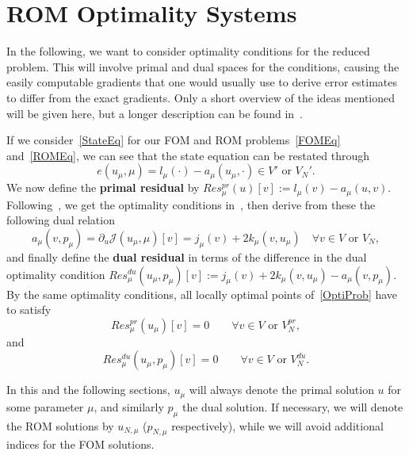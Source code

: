 \section{ROM Optimality Systems}

In the following, we want to consider optimality conditions for the reduced problem.
This will involve primal and dual spaces for the conditions, causing the easily computable gradients that one would usually use to derive error estimates to differ from the exact gradients.
Only a short overview of the ideas mentioned will be given here, but a longer description can be found in~\cite[Section 3]{Keil2021}.

If we consider~\eqref{StateEq} for our FOM and ROM problems~\eqref{FOMEq} and~\eqref{ROMEq}, we can see that the state equation can be restated through
\begin{equation*}
    e(u_\mu, \mu) = l_\mu(\cdot) - a_\mu(u_\mu, \cdot) \in V' \text{ or } V_N'.
\end{equation*}
We now define the \textbf{primal residual} by $Res_\mu^{pr}(u)[v] := l_\mu(v) - a_\mu(u, v)$.
Following~\cite[Corollary 1.3]{Hinze2009}, we get the optimality conditions in~\cite[Proposition 2.9]{Keil2021}, then derive from these the following dual relation
\begin{equation*}
    a_\mu(v, p_\mu) = \partial_u \mathcal{J}(u_\mu, \mu)[v] = j_\mu(v) + 2 k_\mu(v, u_\mu) \quad \forall v \in V \text{ or } V_N,
\end{equation*}
and finally define the \textbf{dual residual} in terms of the difference in the dual optimality condition $Res_\mu^{du}(u_\mu, p_\mu)[v] := j_\mu(v) + 2 k_\mu(v, u_\mu) - a_\mu(v, p_\mu)$.
By the same optimality conditions, all locally optimal points of~\eqref{OptiProb} have to satisfy
\begin{equation}\label{PrimalEq}
    Res_\mu^{pr}(u_\mu)[v] = 0 \qquad \forall v \in V \text{ or } V_N^{pr},
\end{equation}
and
\begin{equation}\label{DualEq}
    Res_\mu^{du}(u_\mu, p_\mu)[v] = 0 \qquad \forall v \in V \text{ or } V_N^{du}.
\end{equation}

In this and the following sections, $u_\mu$ will always denote the primal solution $u$ for some parameter $\mu$, and similarly $p_\mu$ the dual solution.
If necessary, we will denote the ROM solutions by $u_{N, \mu}$ ($p_{N, \mu}$ respectively), while we will avoid additional indices for the FOM solutions.

